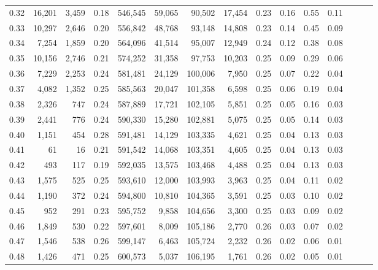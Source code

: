 \begin{tabular}{rrrrrrrrrrrrrrr}
0.32 &  16,201 &  3,459 &  0.18 &  546,545 &   59,065 &   90,502 &   17,454 &  0.23 &  0.16 &  0.55 &      0.11 \\
0.33 &  10,297 &  2,646 &  0.20 &  556,842 &   48,768 &   93,148 &   14,808 &  0.23 &  0.14 &  0.45 &      0.09 \\
0.34 &   7,254 &  1,859 &  0.20 &  564,096 &   41,514 &   95,007 &   12,949 &  0.24 &  0.12 &  0.38 &      0.08 \\
0.35 &  10,156 &  2,746 &  0.21 &  574,252 &   31,358 &   97,753 &   10,203 &  0.25 &  0.09 &  0.29 &      0.06 \\
0.36 &   7,229 &  2,253 &  0.24 &  581,481 &   24,129 &  100,006 &    7,950 &  0.25 &  0.07 &  0.22 &      0.04 \\
0.37 &   4,082 &  1,352 &  0.25 &  585,563 &   20,047 &  101,358 &    6,598 &  0.25 &  0.06 &  0.19 &      0.04 \\
0.38 &   2,326 &    747 &  0.24 &  587,889 &   17,721 &  102,105 &    5,851 &  0.25 &  0.05 &  0.16 &      0.03 \\
0.39 &   2,441 &    776 &  0.24 &  590,330 &   15,280 &  102,881 &    5,075 &  0.25 &  0.05 &  0.14 &      0.03 \\
0.40 &   1,151 &    454 &  0.28 &  591,481 &   14,129 &  103,335 &    4,621 &  0.25 &  0.04 &  0.13 &      0.03 \\
0.41 &      61 &     16 &  0.21 &  591,542 &   14,068 &  103,351 &    4,605 &  0.25 &  0.04 &  0.13 &      0.03 \\
0.42 &     493 &    117 &  0.19 &  592,035 &   13,575 &  103,468 &    4,488 &  0.25 &  0.04 &  0.13 &      0.03 \\
0.43 &   1,575 &    525 &  0.25 &  593,610 &   12,000 &  103,993 &    3,963 &  0.25 &  0.04 &  0.11 &      0.02 \\
0.44 &   1,190 &    372 &  0.24 &  594,800 &   10,810 &  104,365 &    3,591 &  0.25 &  0.03 &  0.10 &      0.02 \\
0.45 &     952 &    291 &  0.23 &  595,752 &    9,858 &  104,656 &    3,300 &  0.25 &  0.03 &  0.09 &      0.02 \\
0.46 &   1,849 &    530 &  0.22 &  597,601 &    8,009 &  105,186 &    2,770 &  0.26 &  0.03 &  0.07 &      0.02 \\
0.47 &   1,546 &    538 &  0.26 &  599,147 &    6,463 &  105,724 &    2,232 &  0.26 &  0.02 &  0.06 &      0.01 \\
0.48 &   1,426 &    471 &  0.25 &  600,573 &    5,037 &  106,195 &    1,761 &  0.26 &  0.02 &  0.05 &      0.01 \\

\end{tabular}
